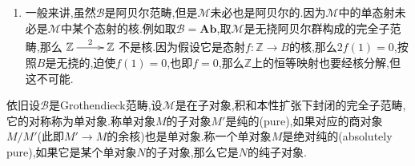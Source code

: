 \begin{enumerate}
\begin{proof}
    	于是$\left(K\to B''\to E\right)=\left(K\to B\to\mathscr{N}(B)\to E\right)=0$.但是$B''\to E$是单态射,这就得到$K\to B''$是零态射.
    \end{proof}
    \item 一般来讲,虽然$\mathscr{B}$是阿贝尔范畴,但是$\mathscr{M}$未必也是阿贝尔的.因为$\mathscr{M}$中的单态射未必是$\mathscr{M}$中某个态射的核.例如取$\mathscr{B}=\textbf{Ab}$,取$\mathscr{M}$是无挠阿贝尔群构成的完全子范畴,那么$\xymatrix{\mathbb{Z}\ar[r]^2&\mathbb{Z}}$不是核.因为假设它是态射$f:\mathbb{Z}\to B$的核,那么$2f(1)=0$,按照$B$是无挠的,迫使$f(1)=0$,也即$f=0$,那么$\mathbb{Z}$上的恒等映射也要经核分解,但这不可能.
\end{enumerate}

依旧设$\mathscr{B}$是Grothendieck范畴,设$\mathscr{M}$是在子对象,积和本性扩张下封闭的完全子范畴,它的对称称为单对象.称单对象$M$的子对象$M'$是纯的(pure),如果对应的商对象$M/M'$(此即$M'\to M$的余核)也是单对象.称一个单对象$M$是绝对纯的(absolutely pure),如果它是某个单对象$N$的子对象,那么它是$N$的纯子对象.
